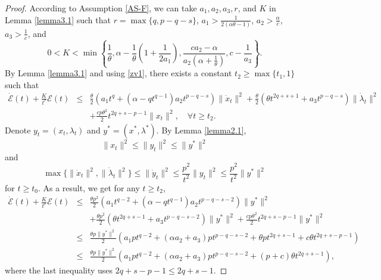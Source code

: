 \documentclass[review]{elsarticle}
\begin{document}
\begin{proof}
According to Assumption \ref{AS-F}, we can take $a_1, a_2, a_3, r$, and $K$ in Lemma \ref{lemma3.1} such that $r=\max\{q, p-q-s\}$, $a_1>\frac{1}{2(\alpha\theta-1)}$, $a_2>\frac{\alpha}{c}$,  $a_3>\frac{1}{c}$, and
		$$0<K<\min\left\{\frac{1}{\theta}, \alpha-\frac{1}{\theta}\left(1+\frac{1}{2a_1}\right), \frac{ca_2-\alpha}{a_2(\alpha+\frac{1}{\theta})}, c-\frac{1}{a_3}\right\}.$$
		By  Lemma \ref{lemma3.1} and using \eqref{zv1}, there exists a constant $t_2\geq\max\{t_1,1\}$ such that 
		\begin{eqnarray*}
			\dot{\mathcal{E}}(t)+\frac{K}{t^r}\mathcal{E}(t)
			&\leq&\frac{\theta}{2}\left(a_1t^q+(\alpha- qt^{q-1})a_2t^{p-q-s}\right)\|\dot{x}_t\|^2+\frac{\theta}{2}\left(\theta t^{2q+s+1}+a_3 t^{p-q-s}\right)\|\dot{\lambda}_t\|^2\\
			&&+\frac{cp\theta^2}{2}t^{2q+s-p-1}\|x_t\|^2, \quad \forall t\geq t_2.
		\end{eqnarray*}	
		Denote $y_t=(x_t, \lambda_t)$ and $y^*=(x^*,\lambda^*)$. By Lemma \ref{lemma2.1},
		$$\|x_t\|^2\leq\|y_t\|^2\leq\|y^*\|^2$$
and
		$$\max\{\|\dot{x}_t\|^2,\|\dot{\lambda}_t\|^2\}\leq\|\dot{y}_t\|^2\leq\frac{p^2}{t^2}\|y_t\|^2\leq\frac{p^2}{t^2}\|y^*\|^2 $$
 for $t\geq t_0$.
		As a result, we get  for any $t\geq t_2$,
		\begin{eqnarray}\label{z11}
			\dot{\mathcal{E}}(t)+\frac{K}{t^r}\mathcal{E}(t)
			&\leq&\frac{\theta p^2}{2}\left(a_1t^{q-2}+(\alpha- qt^{q-1})a_2t^{p-q-s-2}\right)\|y^*\|^2\nonumber\\
			&&+\frac{\theta p^2}{2}\left(\theta t^{2q+s-1}+a_3 t^{p-q-s-2}\right)\|y^*\|^2+\frac{cp\theta^2}{2}t^{2q+s-p-1}\|y^*\|^2\nonumber\\
			&\leq&\frac{\theta p\|y^*\|^2}{2}\left(a_1pt^{q-2}+(\alpha a_2+a_3)pt^{p-q-s-2}+\theta pt^{2q+s-1}+c\theta t^{2q+s-p-1}\right)\nonumber\\
			&\leq&\frac{\theta p\|y^*\|^2}{2}\left(a_1pt^{q-2}+(\alpha a_2+a_3)pt^{p-q-s-2}+(p+c)\theta t^{2q+s-1}\right),
		\end{eqnarray}
		where the last inequality uses $2q+s-p-1\leq2q+s-1$.  
		

\end{proof}
\end{document}
